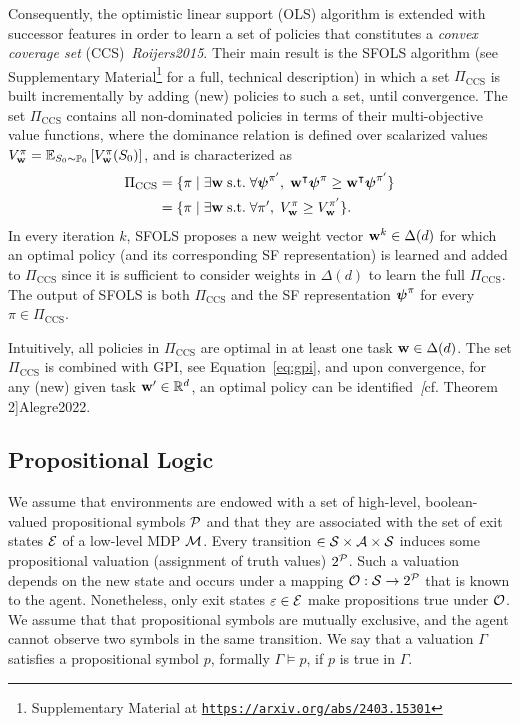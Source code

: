  Consequently, the optimistic linear support (OLS) algorithm is extended with successor features in order to learn a set of policies that constitutes a \textit{convex coverage set} (CCS)~\textit{Roijers2015}. Their main result is the SFOLS algorithm (see Supplementary Material\footnote{Supplementary Material at {\texttt{\url{https://arxiv.org/abs/2403.15301}}}} for a full, technical description) in which a set $\Pi_\text{CCS}$ is built incrementally by adding (new) policies to such a set, until convergence. The set $\Pi_\text{CCS}$ contains all non-dominated policies in terms of their multi-objective value functions, where the dominance relation is defined over scalarized values ${V^\pi_{\mathbf{w}} = \mathbb{E}_{S_0\sim\mathbb{P}_0}\left[V^\pi_{\mathbf{w}}(S_0)\right]}$, and is characterized as
\begin{align}
  \Pi_\text{CCS} &= \{\pi\;\lvert\;\exists\mathbf{w}\;\text{s.t.}\;\forall {\boldsymbol{\mathbf{\psi}}}^{\pi'},\; \mathbf{w}^\intercal {\boldsymbol{\mathbf{\psi}}}^\pi {\;\geq\;} \mathbf{w}^\intercal{\boldsymbol{\mathbf{\psi}}}^{\pi'} \} \nonumber\\
  &= \{ \pi \;\lvert\;\exists\mathbf{w}\;\text{s.t.}\;\forall {\pi'},\; {V^\pi_{\mathbf{w}}}{\;\geq\;} {V^{\pi'}_{\mathbf{w}}}\}.
\end{align} 
In every iteration $k$, SFOLS proposes a new weight vector $\mathbf{w}^k\in\Delta(d)$ for which an optimal policy (and its corresponding SF representation) is learned and added to $\Pi_\text{CCS}$ since it is sufficient to consider weights in $\Delta(d)$ to learn the full $\Pi_\text{CCS}$. The output of SFOLS is both $\Pi_\text{CCS}$ and the SF representation $\boldsymbol{\mathbf{\psi}}^\pi$ for every $\pi\in\Pi_\text{CCS}$.
 
Intuitively, all policies in $\Pi_\text{CCS}$ are optimal in at least one task $\mathbf{w} \in \Delta(d)$.
The set $\Pi_\text{CCS}$ is combined with GPI, see Equation~\eqref{eq:gpi}, and upon convergence, for any (new) given task $\mathbf{w}'\in\mathbb{R}^d$, an optimal policy can be identified~\textit[cf. Theorem 2]{Alegre2022}.


\subsection{Propositional Logic}
We assume that environments are endowed with a set of high-level, boolean-valued propositional symbols $\mathcal{P}$ and that they are associated with the set of exit states $\mathcal{E}$ of a low-level MDP $\mathcal{M}$. Every transition $\in\mathcal{S}\times\mathcal{A}\times\mathcal{S}$ induces some propositional valuation (assignment of truth values) $2^{\mathcal{P}}$. Such a valuation depends on the new state and occurs under a mapping ${\mathcal{O}:\mathcal{S}\rightarrow2^{\mathcal{P}}}$ that is known to the agent. Nonetheless, only exit states $\varepsilon\in\mathcal{E}$ make propositions true under $\mathcal{O}$. We assume that that propositional symbols are mutually exclusive, and the agent cannot observe two symbols in the same transition. We say that a valuation $\Gamma$ satisfies a propositional symbol $p$, formally $\Gamma\vDash p$, if $p$ is true in $\Gamma$. 

